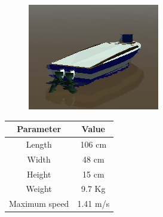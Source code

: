     \begin{minipage}{\textwidth}
        \begin{minipage}[b]{0.35\textwidth}
        \centering
        \begin{figure}[H]
            \centering
            \includegraphics[scale=0.75]{figs/Chap5/diffboat.png}
        \end{figure}
        \label{fig:diffboat}
        \end{minipage}
        \begin{minipage}[b]{0.5\textwidth}
        \centering
            \begin{tabular}{cc}
                \toprule
                    \textbf{Parameter}       & \textbf{Value}       \\
                \midrule
                    Length          & 106 cm      \\
                    Width           & 48 cm       \\
                    Height          & 15 cm       \\
                    Weight          & 9.7 Kg      \\
                    Maximum speed   & 1.41 m/s    \\ 
                \bottomrule
            \end{tabular}
        \label{tab:diffboat_specs}
        \end{minipage}
    \end{minipage}
    
    \vskip 1cm

